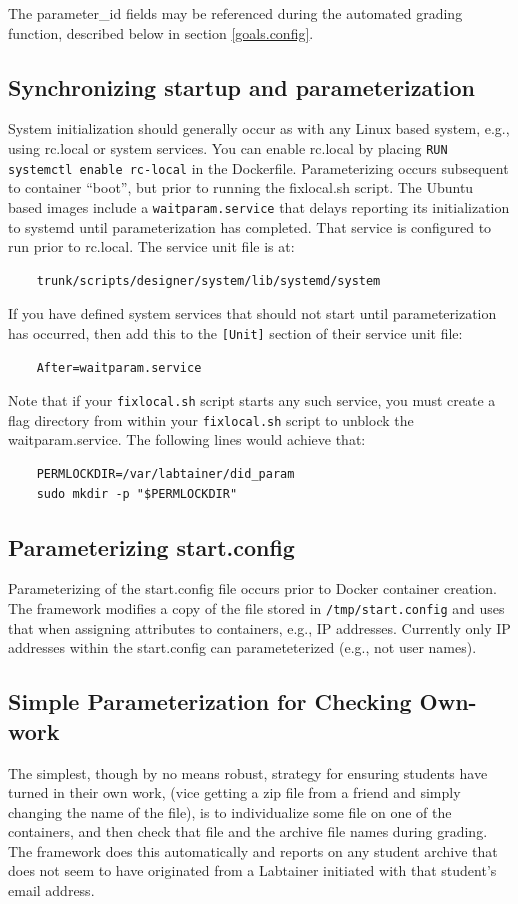 \documentclass[12pt]{article}
\begin{document}
The parameter\_id fields may be referenced during the automated grading function, described below
in section \ref{goals.config}. 

\subsection{Synchronizing startup and parameterization}
System initialization should generally occur as with any Linux based system, e.g., using rc.local
or system services.
You can enable rc.local by placing {\tt RUN systemctl enable rc-local} in the Dockerfile.
Parameterizing occurs subsequent to container ``boot'', but prior to running the fixlocal.sh script.
The Ubuntu based images include a {\tt waitparam.service} that delays reporting its initialization to
systemd until parameterization has completed.  That service is configured to run prior to rc.local.
The service unit file is at:
\begin{verbatim}
    trunk/scripts/designer/system/lib/systemd/system
\end{verbatim}
If you have defined system services that should not start until parameterization has occurred, then
add this to the {\tt[Unit]} section of their service unit file:
\begin{verbatim}
    After=waitparam.service
\end{verbatim}
\noindent Note that if your {\tt fixlocal.sh} script starts any such service, you must create a flag
directory from within your {\tt fixlocal.sh} script to unblock the waitparam.service.  The following
lines would achieve that:
\begin{verbatim}
    PERMLOCKDIR=/var/labtainer/did_param
    sudo mkdir -p "$PERMLOCKDIR"
\end{verbatim}

\subsection{Parameterizing start.config}
Parameterizing of the start.config file occurs prior to Docker container creation.  The framework 
modifies a copy of the file stored in {\tt /tmp/start.config} and uses that when assigning attributes to containers,
e.g., IP addresses. Currently only IP addresses within the start.config can parameteterized (e.g., not user names).

\subsection{Simple Parameterization for Checking Own-work}
The simplest, though by no means robust, strategy for ensuring students
have turned in their own work, (vice getting a zip file from a friend and simply
changing the name of the file), is to individualize some file on one of the containers,
and then check that file and the archive file names during grading.  The framework does
this automatically and reports on any student archive that does not seem to have
originated from a Labtainer initiated with that student's email address.
\end{document}
